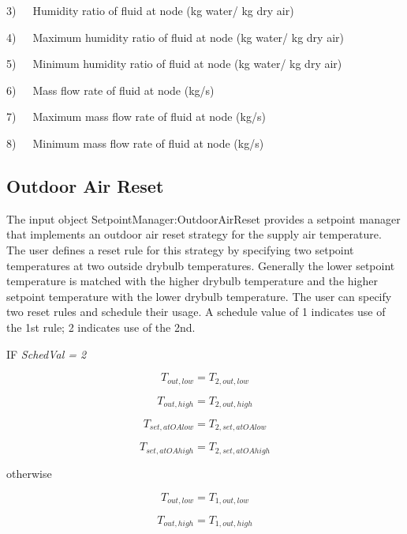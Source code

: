 3)~~~Humidity ratio of fluid at node (kg water/ kg dry air)

4)~~~Maximum humidity ratio of fluid at node (kg water/ kg dry air)

5)~~~Minimum humidity ratio of fluid at node (kg water/ kg dry air)

6)~~~Mass flow rate of fluid at node (kg/s)

7)~~~Maximum mass flow rate of fluid at node (kg/s)

8)~~~Minimum mass flow rate of fluid at node (kg/s)

\subsection{Outdoor Air Reset}\label{outdoor-air-reset}

The input object SetpointManager:OutdoorAirReset provides a setpoint manager that implements an outdoor air reset strategy for the supply air temperature. The user defines a reset rule for this strategy by specifying two setpoint temperatures at two outside drybulb temperatures. Generally the lower setpoint temperature is matched with the higher drybulb temperature and the higher setpoint temperature with the lower drybulb temperature. The user can specify two reset rules and schedule their usage. A schedule value of 1 indicates use of the 1st rule; 2 indicates use of the 2nd.

IF \emph{SchedVal = 2}

\begin{equation}
{T_{out,low}} = {T_{2,out,low}}
\end{equation}

\begin{equation}
{T_{out,high}} = {T_{2,out,high}}
\end{equation}

\begin{equation}
{T_{set,atOAlow}} = {T_{2,set,atOAlow}}
\end{equation}

\begin{equation}
{T_{set,atOAhigh}} = {T_{2,set,atOAhigh}}
\end{equation}

otherwise

\begin{equation}
{T_{out,low}} = {T_{1,out,low}}
\end{equation}

\begin{equation}
{T_{out,high}} = {T_{1,out,high}}
\end{equation}

